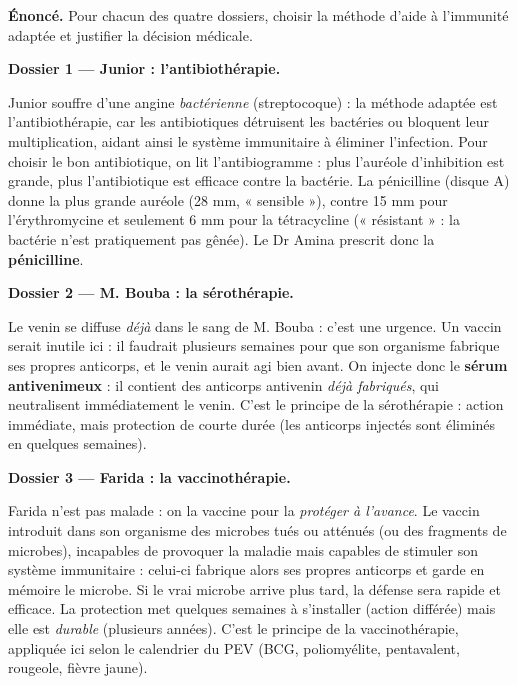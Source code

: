 \documentclass[11pt]{article}
\newcommand{\cle}[1]{{\popxbold\color{popdark}#1}}
\newcounter{popsec}
\newcounter{popsub}
\newcommand{\courssub}[1]{%
  \stepcounter{popsub}%
  \par\vspace{9pt}\noindent{\popxbold\fontsize{11.5}{13}\selectfont\color{popink}{\color{poporange}\thepopsec.\thepopsub}\hspace{6pt}#1}\par\nopagebreak\vspace{4pt}
}
\begin{document}
\courssub{Démarche et corrigé commenté}

\begin{exoresolu}
\textbf{Énoncé.} Pour chacun des quatre dossiers, choisir la méthode d'aide à l'immunité adaptée et justifier la décision médicale.

\tcblower

\textbf{Dossier 1 — Junior : l'antibiothérapie.}

Junior souffre d'une angine \emph{bactérienne} (streptocoque) : la méthode adaptée est l'\cle{antibiothérapie}, car les antibiotiques détruisent les bactéries ou bloquent leur multiplication, aidant ainsi le système immunitaire à éliminer l'infection. Pour choisir le bon antibiotique, on lit l'antibiogramme : plus l'auréole d'inhibition est grande, plus l'antibiotique est efficace contre la bactérie. La pénicilline (disque A) donne la plus grande auréole (28 mm, « sensible »), contre 15 mm pour l'érythromycine et seulement 6 mm pour la tétracycline (« résistant » : la bactérie n'est pratiquement pas gênée). Le Dr Amina prescrit donc la \textbf{pénicilline}.

\textbf{Dossier 2 — M. Bouba : la sérothérapie.}

Le venin se diffuse \emph{déjà} dans le sang de M. Bouba : c'est une urgence. Un vaccin serait inutile ici : il faudrait plusieurs semaines pour que son organisme fabrique ses propres anticorps, et le venin aurait agi bien avant. On injecte donc le \textbf{sérum antivenimeux} : il contient des anticorps antivenin \emph{déjà fabriqués}, qui neutralisent immédiatement le venin. C'est le principe de la \cle{sérothérapie} : action immédiate, mais protection de courte durée (les anticorps injectés sont éliminés en quelques semaines).

\textbf{Dossier 3 — Farida : la vaccinothérapie.}

Farida n'est pas malade : on la vaccine pour la \emph{protéger à l'avance}. Le vaccin introduit dans son organisme des microbes tués ou atténués (ou des fragments de microbes), incapables de provoquer la maladie mais capables de stimuler son système immunitaire : celui-ci fabrique alors ses propres anticorps et garde en mémoire le microbe. Si le vrai microbe arrive plus tard, la défense sera rapide et efficace. La protection met quelques semaines à s'installer (action différée) mais elle est \emph{durable} (plusieurs années). C'est le principe de la \cle{vaccinothérapie}, appliquée ici selon le calendrier du PEV (BCG, poliomyélite, pentavalent, rougeole, fièvre jaune).


\end{exoresolu}
\end{document}
